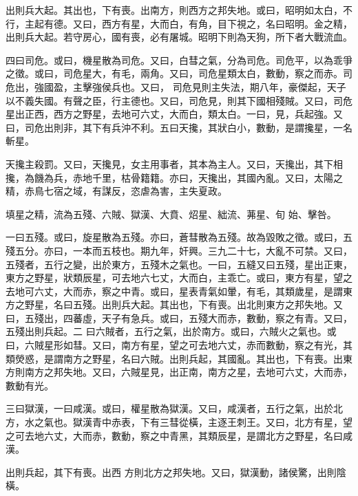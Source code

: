 \begin{pinyinscope}
 出則兵大起。其出也，下有喪。出南方，則西方之邦失地。或曰，昭明如太白，不行，主起有德。又曰，西方有星，大而白，有角，目下視之，名曰昭明。金之精，出則兵大起。若守房心，國有喪，必有屠城。昭明下則為天狗，所下者大戰流血。



 四曰司危。或曰，機星散為司危。又曰，白彗之氣，分為司危。司危平，以為乖爭之徵。或曰，司危星大，有毛，兩角。又曰，司危星類太白，數動，察之而赤。司危出，強國盈，主擊強侯兵也。又曰，
 司危見則主失法，期八年，豪傑起，天子以不義失國。有聲之臣，行主德也。又曰，司危見，則其下國相殘賊。又曰，司危星出正西，西方之野星，去地可六丈，大而白，類太白。一曰，見，兵起強。又曰，司危出則非，其下有兵沖不利。五曰天攙，其狀白小，數動，是謂攙星，一名斬星。



 天攙主殺罰。又曰，天攙見，女主用事者，其本為主人。又曰，天攙出，其下相攙，為饑為兵，赤地千里，枯骨籍籍。亦曰，天攙出，其國內亂。又曰，太陽之精，赤鳥七宿之域，有謀反，恣虐為害，主失夏政。



 填星之精，流為五殘、六賊、獄漢、大賁、炤星、絀流、茀星、旬
 始、擊咎。



 一曰五殘。或曰，旋星散為五殘。亦曰，蒼彗散為五殘。故為毀敗之徵。或曰，五殘五分。亦曰，一本而五枝也。期九年，奸興。三九二十七，大亂不可禁。又曰，五殘者，五行之變，出於東方，五殘木之氣也。一曰，五縫又曰五殘，星出正東，東方之野星，狀類辰星，可去地六七丈，大而白，主乖亡。或曰，東方有星，望之去地可六丈，大而赤，察之中青。或曰，星表青氣如暈，有毛，其類歲星，是謂東方之野星，名曰五殘。出則兵大起。其出也，下有喪。出北則東方之邦失地。又曰，五殘出，四蕃虛，天子有急兵。或曰，五殘大而赤，數動，察之有青。又曰，五殘出則兵起。二
 曰六賊者，五行之氣，出於南方。或曰，六賊火之氣也。或曰，六賊星形如彗。又曰，南方有星，望之可去地六丈，赤而數動，察之有光，其類熒惑，是謂南方之野星，名曰六賊。出則兵起，其國亂。其出也，下有喪。出東方則南方之邦失地。又曰，六賊星見，出正南，南方之星，去地可六丈，大而赤，數動有光。



 三曰獄漢，一曰咸漢。或曰，權星散為獄漢。又曰，咸漢者，五行之氣，出於北方，水之氣也。獄漢青中赤表，下有三彗從橫，主逐王刺王。又曰，北方有星，望之可去地六丈，大而赤，數動，察之中青黑，其類辰星，是謂北方之野星，名曰咸漢。



 出則兵起，其下有喪。出西
 方則北方之邦失地。又曰，獄漢動，諸侯驚，出則陰橫。




\end{pinyinscope}
